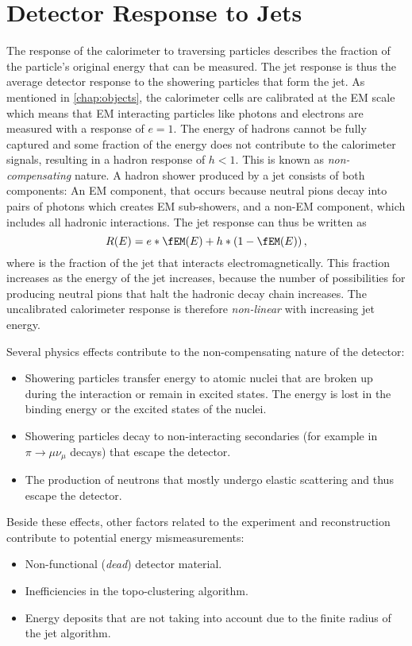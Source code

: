 \section{Detector Response to Jets}
The response of the calorimeter to traversing particles describes the fraction of the particle's original energy that can be measured. The jet response is thus the average detector response to the showering particles that form the jet.
As mentioned in \cref{chap:objects}, the calorimeter cells are calibrated at the EM scale which means that EM interacting particles like photons and electrons are measured with a response of $e = 1$. The energy of hadrons cannot be fully captured and some fraction of the energy does not contribute to the calorimeter signals, resulting in a hadron response of $h < 1$. This is known as \emph{non-compensating} nature.
A hadron shower produced by a jet consists of both components:
An EM component, that occurs because neutral pions decay into pairs of photons which creates EM sub-showers, and a non-EM component, which includes all hadronic interactions.
The jet response can thus be written as
\begin{equation}
    R(E) = e*\fEM(E) + h * \left(1 - \fEM(E)\right),
\end{equation}
where \fEM is the fraction of the jet that interacts electromagnetically. This fraction increases as the energy of the jet increases, because the number of possibilities for producing neutral pions that halt the hadronic decay chain increases. The uncalibrated calorimeter response is therefore \emph{non-linear} with increasing jet energy.

Several physics effects contribute to the non-compensating nature of the detector:
\begin{itemize}
    \item Showering particles transfer energy to atomic nuclei that are broken up during the interaction or remain in excited states. The energy is lost in the binding energy or the excited states of the nuclei.
    \item Showering particles decay to non-interacting secondaries (for example in $\pi \rightarrow \mu \nu_\mu$ decays) that escape the detector.
    \item The production of neutrons that mostly undergo elastic scattering and thus escape the detector.
\end{itemize}
Beside these effects, other factors related to the experiment and reconstruction contribute to potential energy mismeasurements:
\begin{itemize}
    \item Non-functional (\emph{dead}) detector material.
    \item Inefficiencies in the topo-clustering algorithm.
    \item Energy deposits that are not taking into account due to the finite radius of the jet algorithm.
\end{itemize}

